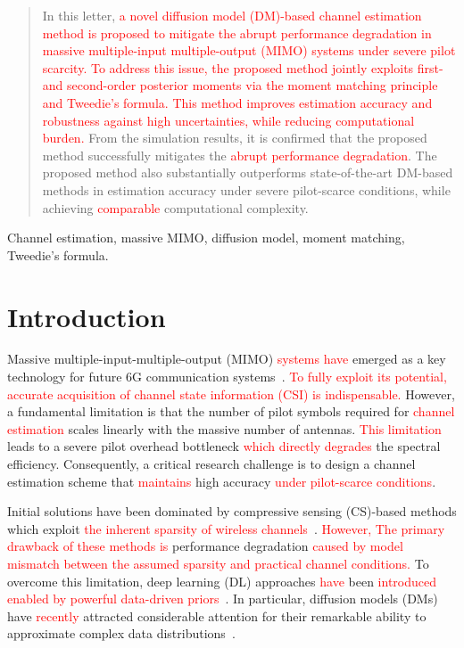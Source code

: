 \documentclass[lettersize,journal]{IEEEtran}
\newcommand{\tred}{\textcolor{red}}
\begin{document}
\maketitle
\begin{abstract}
In this letter, \tred{a novel diffusion model (DM)-based channel estimation method is proposed to mitigate the abrupt performance degradation in massive multiple-input multiple-output (MIMO) systems under severe pilot scarcity.} \tred{To address this issue, the proposed method jointly exploits first- and second-order posterior moments via the moment matching principle and Tweedie’s formula.} \tred{This method improves estimation accuracy and robustness against high uncertainties, while reducing computational burden.} From the simulation results, it is confirmed that the proposed method successfully mitigates the \tred{abrupt performance degradation}. The proposed method also substantially outperforms state-of-the-art DM-based methods in estimation accuracy under severe pilot-scarce conditions, while achieving \tred{comparable} computational complexity.
\end{abstract}

\begin{IEEEkeywords}
Channel estimation, massive MIMO, diffusion model, moment matching, Tweedie's formula.
\end{IEEEkeywords}


\section{Introduction}

Massive multiple-input-multiple-output (MIMO) \tred{systems have} emerged as a key technology for future 6G communication systems~\cite{busariMillimeterWaveMassiveMIMO2018}. \tred{To fully exploit its potential, accurate acquisition of channel state information (CSI) is indispensable.} However, a fundamental limitation is that the number of pilot symbols required for \tred{channel estimation} scales linearly with the massive number of antennas. \tred{This limitation} leads to a severe pilot overhead bottleneck \tred{which directly degrades} the spectral efficiency. Consequently, a critical research challenge is to design a channel estimation scheme that \tred{maintains} high accuracy \tred{under pilot-scarce conditions}.

Initial solutions have been dominated by compressive sensing (CS)-based methods which exploit \tred{the inherent sparsity of wireless channels}~\cite{zhangAtomicNormDenoisingBased2018,choiCompressedSensingWireless2017}. \tred{However, The primary drawback of these methods is} performance degradation \tred{caused by model mismatch between the assumed sparsity and practical channel conditions.} To overcome this limitation, deep learning (DL) approaches \tred{have} been \tred{introduced enabled by powerful data-driven priors}~\cite{kimDeepLearningaidedWireless2023}. In particular, diffusion models (DMs) have \tred{recently} attracted considerable attention for their remarkable ability to approximate complex data distributions~\cite{hoDenoisingDiffusionProbabilistic2020,vanhuynhGenerativeAIPhysical2024}.
\end{document}
